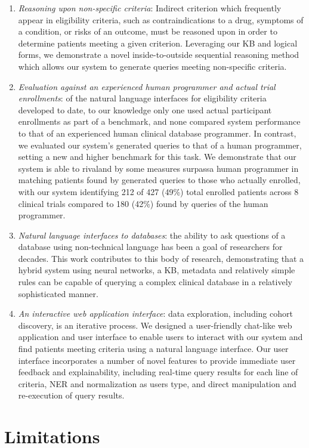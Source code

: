 \documentclass[../main.tex]{subfiles}
\begin{document}
\begin{enumerate}
    \item \textit{Reasoning upon non-specific criteria}: Indirect criterion which frequently appear in eligibility criteria, such as contraindications to a drug, symptoms of a condition, or risks of an outcome, must be reasoned upon in order to determine patients meeting a given criterion. Leveraging our KB and logical forms, we demonstrate a novel inside-to-outside sequential reasoning method which allows our system to generate queries meeting non-specific criteria.
    \item \textit{Evaluation against an experienced human programmer and actual trial enrollments}: of the natural language interfaces for eligibility criteria developed to date, to our knowledge only one used actual participant enrollments as part of a benchmark, and none compared system performance to that of an experienced human clinical database programmer. In contrast, we evaluated our system's generated queries to that of a human programmer, setting a new and higher benchmark for this task. We demonstrate that our system is able to rival\textemdash and by some measures surpass\textemdash a human programmer in matching patients found by generated queries to those who actually enrolled, with our system identifying 212 of 427 (49\%) total enrolled patients across 8 clinical trials compared to 180 (42\%) found by queries of the human programmer.
    \item \textit{Natural language interfaces to databases}: the ability to ask questions of a database using non-technical language has been a goal of researchers for decades. This work contributes to this body of research, demonstrating that a hybrid system using neural networks, a KB, metadata and relatively simple rules can be capable of querying a complex clinical database in a relatively sophisticated manner.
    \item \textit{An interactive web application interface}: data exploration, including cohort discovery, is an iterative process. We designed a user-friendly chat-like web application and user interface to enable users to interact with our system and find patients meeting criteria using a natural language interface. Our user interface incorporates a number of novel features to provide immediate user feedback and explainability, including real-time query results for each line of criteria, NER and normalization as users type, and direct manipulation and re-execution of query results.
\end{enumerate}

\section{Limitations}
\end{document}
